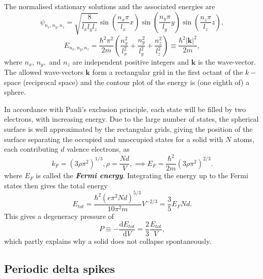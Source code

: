 \documentclass{article}
\theoremstyle{nonumberplain}
\begin{document}
The normalised stationary solutions and the associated energies are 
\[
    \psi_{n_x,n_{y} ,n_{z} } = \sqrt{\frac{8}{l_{x} l_{y} l_{z} }} 
    \sin \left( \frac{n_{x} \pi }{l_{x} }x \right)
    \sin \left( \frac{n_{y} \pi }{l_{y} }y \right)
    \sin \left( \frac{n_{z} \pi }{l_{z} }z \right),
\]
\[
    E_{n_{x} ,n_{y} ,n_{z} } = 
    \frac{\hbar ^{2} \pi ^{2} }{2 m } \left( \frac{n_{x} ^{2} }{l_{x} ^{2} } + \frac{n_{y} ^{2} }{l_{y} ^{2} } + \frac{n_{z} ^{2} }{l_{z} ^{2} }\right)
    \equiv \frac{\hbar ^{2} \left\vert \mathbf{k}  \right\vert ^{2} }{2m}, 
\]
where $n_x$, $n_{y} ,$ and $n_{z} $ are independent positive integers and $\mathbf{k} $ is the wave-vector. 
The allowed wave-vectors $\mathbf{k} $ form a rectangular grid in the first octant of the $k-$space (reciprocal space) and the contour plot of the energy is (one eighth of) a sphere. 

In accordance with Pauli's exclusion principle, each state will be filled by two electrons, with increasing energy. Due to the large number of states, the spherical surface is well approximated by the rectangular grids, giving the position of the surface separating the occupied and unoccupied states for a solid with $N$ atoms, each contributing $d$ valence electrons, as 
\[
    k_F = \left( 3 \rho \pi ^{2} \right)^{1 /3}, 
    \rho  = \frac{Nd}{V}, 
    \implies E_F = \frac{\hbar ^{2} }{2m } \left( 3 \rho \pi ^{2} \right)^{2 /3}.  
\]
where $E_F$ is called the \textit{\textbf{Fermi energy}}. Integrating the energy up to the Fermi states then gives the total energy 
\[
    E_{tot} = \frac{\hbar ^{2} (e \pi ^{2} N d)^{5 /3}}{10 \pi ^{2} m } V^{-2/3}
    = \frac{3}{5} E_F Nd. 
\]
This gives a degeneracy pressure of 
\[
    P \equiv - \frac{\mathrm{d}E_{tot}}{\mathrm{d}V}
    = \frac{2}{3} \frac{E_{tot}}{V}, 
\]
which partly explains why a solid does not collapse spontaneously. 
\subsection{Periodic delta spikes}  
\end{document}
